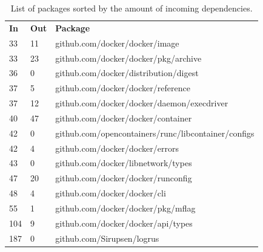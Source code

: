 \begin{table}
\label{tab:deptablehighestin}
\caption{List of packages sorted by the amount of incoming dependencies.}

\begin{tabular}{l l l}
\textbf{In} & \textbf{Out} & \textbf{Package} \\
33 & 11 & github.com/docker/docker/image \\
33 & 23 & github.com/docker/docker/pkg/archive \\
36 & 0 & github.com/docker/distribution/digest \\
37 & 5 & github.com/docker/docker/reference \\
37 & 12 & github.com/docker/docker/daemon/execdriver \\
40 & 47 & github.com/docker/docker/container \\
42 & 0 & github.com/opencontainers/runc/libcontainer/configs \\
42 & 4 & github.com/docker/docker/errors \\
43 & 0 & github.com/docker/libnetwork/types \\
47 & 20 & github.com/docker/docker/runconfig \\
48 & 4 & github.com/docker/docker/cli \\
55 & 1 & github.com/docker/docker/pkg/mflag \\
104 & 9 & github.com/docker/docker/api/types \\
187 & 0 & github.com/Sirupsen/logrus \\
\end{tabular} 
\end{table}


